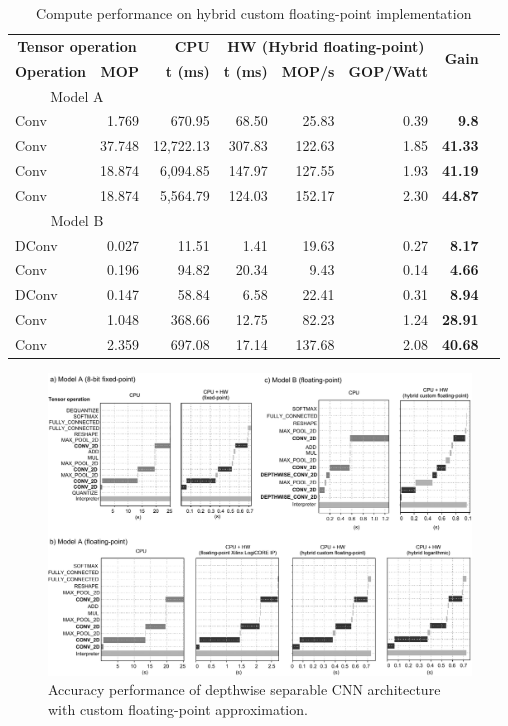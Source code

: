 \begin{table}[!htp]\centering
	\caption{Compute performance on hybrid custom floating-point implementation}\label{tab:performace_float_hybrid }
	\scriptsize
\begin{tabular}{lrrrrrrr}\toprule
	\multicolumn{2}{c}{\textbf{Tensor operation}} &\textbf{CPU} &\multicolumn{3}{c}{\textbf{HW (Hybrid floating-point)}} &\multirow{2}{*}{\textbf{Gain}} \\\cmidrule{1-6}
	\textbf{Operation} &\textbf{MOP} &\textbf{t (ms)} &\textbf{t (ms)} &\textbf{MOP/s} &\textbf{GOP/Watt} & \\\midrule
	\multicolumn{2}{c}{Model A} & & & & & \\
	Conv &1.769 &670.95 &68.50 &25.83 &0.39 &\textbf{9.8} \\
	Conv &37.748 &12,722.13 &307.83 &122.63 &1.85 &\textbf{41.33} \\
	Conv &18.874 &6,094.85 &147.97 &127.55 &1.93 &\textbf{41.19} \\
	Conv &18.874 &5,564.79 &124.03 &152.17 &2.30 &\textbf{44.87} \\
	\multicolumn{2}{c}{Model B} & & & & & \\
	DConv &0.027 &11.51 &1.41 &19.63 &0.27 &\textbf{8.17} \\
	Conv &0.196 &94.82 &20.34 &9.43 &0.14 &\textbf{4.66} \\
	DConv &0.147 &58.84 &6.58 &22.41 &0.31 &\textbf{8.94} \\
	Conv &1.048 &368.66 &12.75 &82.23 &1.24 &\textbf{28.91} \\
	Conv &2.359 &697.08 &17.14 &137.68 &2.08 &\textbf{40.68} \\
	\bottomrule
\end{tabular}
\end{table}

\begin{figure}[t!]
	\centering
	\includegraphics[width=\textwidth]{../figures/inference_schedule_wide.pdf}
	\caption{Accuracy performance of depthwise separable CNN architecture with custom floating-point approximation.}
	\label{fig:fixed_point}
\end{figure}
